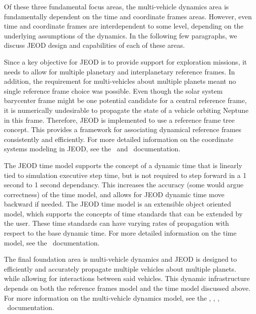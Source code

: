 Of these three fundamental focus areas, the multi-vehicle dynamics area is fundamentally dependent on the time and coordinate frames areas.  However, even time and coordinate frames are interdependent to some level, depending on the underlying assumptions of the dynamics.  In the following few paragraphs, we discuss JEOD design and capabilities of each of these areas.

Since a key objective for JEOD is to provide support for exploration missions, it needs to allow for multiple planetary and interplanetary reference frames.  In addition, the requirement for multi-vehicles about multiple planets meant no single reference frame choice was possible. Even though the solar system barycenter frame might be one potential candidate for a central reference frame, it is numerically undesirable to propagate the state of a vehicle orbiting Neptune in this frame.  Therefore, JEOD is implemented to use a reference frame tree concept.  This provides a framework for associating dynamical reference frames consistently and efficiently.  For more detailed information on the coordinate systems modeling in JEOD, see the \ and \hyperCoordFrame\ documentation.

The JEOD time model supports the concept of a dynamic time that is linearly tied to simulation executive step time, but is not required to step forward in a 1 second to 1 second dependancy.  This increases the accuracy (some would argue correctness) of the time model, and allows for JEOD dynamic time move backward if needed.  The JEOD time model is an extensible object oriented model, which supports the concepts of time standards that can be extended by the user.  These time standards can have varying rates of propagation with respect to the base dynamic time.  For more detailed information on the time model, see the \ documentation.

The final foundation area is multi-vehicle dynamics and JEOD is designed to efficiently and accurately propagate multiple vehicles about multiple planets. while allowing for interactions between said vehicles.  This dynamic infrastructure depends on both the reference frames model and the time model discussed above.  For more information on the multi-vehicle dynamics model, see the  ,  ,  , \ documentation.

